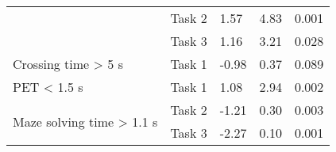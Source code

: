 \begin{table}
{\begin{tabular}{|l|l|lll|}
                                                                                        & Task 2  & 1.57                 & 4.83                  & 0.001            \\ \cline{2-5} 
                                                                                        & Task 3  & 1.16                 & 3.21                  & 0.028            \\ \hline
Crossing time > 5 s                                                                     & Task 1  & -0.98                & 0.37                  & 0.089            \\ \hline
PET < 1.5 s                                                                             & Task 1  & 1.08                 & 2.94                  & 0.002            \\ \hline
\multirow{2}{*}{Maze solving time > 1.1 s}                                              & Task 2  & -1.21                & 0.30                  & 0.003            \\ \cline{2-5} 
                                                                                        & Task 3  & -2.27                & 0.10                  & 0.001            \\ \hline
\end{tabular}}
\label{tab:D2}
\end{table}

